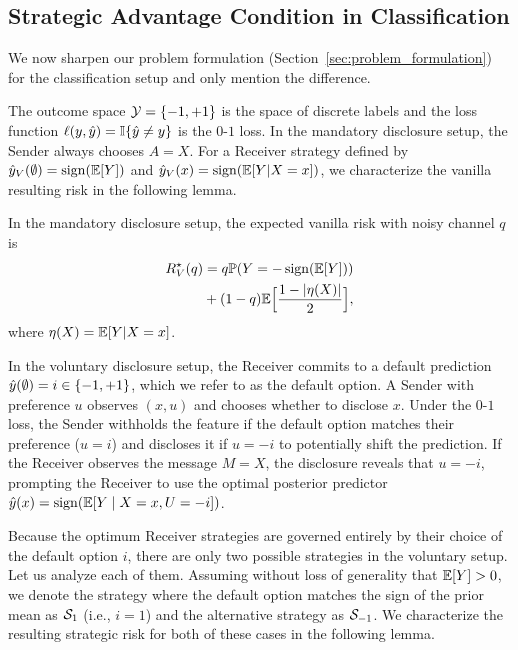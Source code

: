 \subsection{Strategic Advantage Condition in Classification}

We now sharpen our problem formulation (Section~\ref{sec:problem_formulation}) for the classification setup and only mention the difference.

The outcome space $\mathcal{Y} = \{-1,+1\}$ is the space of discrete labels and the loss function $\ell(y, \hat{y}) = \mathbb{I}\{\hat{y} \neq y\}$ is the $0$-$1$ loss. In the mandatory disclosure setup, the Sender always chooses $A=X$. For a Receiver strategy defined by $\hat{y}_V(\emptyset) = \operatorname{sign}(\mathbb{E}[Y])$ and $\hat{y}_V(x) = \operatorname{sign}(\mathbb{E}[Y|X=x])$, we characterize the vanilla resulting risk in the following lemma.

\begin{lemma} \label{lem:rv_classification}
In the mandatory disclosure setup, the expected vanilla risk with noisy channel $q$ is
\begin{align}
R_V^\star(q) &= q\mathbb{P}(Y=-\operatorname{sign}(\mathbb{E}[Y])) \nonumber \\
& + (1-q)\mathbb{E}\Big[\frac{1-|\eta(X)|}{2}\Big], \label{eq:rv_classification}
\end{align}
where $\eta(X) = \mathbb{E}[Y|X=x]$.
\end{lemma}

In the voluntary disclosure setup, the Receiver commits to a default prediction $\hat{y}(\emptyset) = i \in \{-1, +1\}$, which we refer to as the default option. A Sender with preference $u$ observes $(x, u)$ and chooses whether to disclose $x$. Under the $0$-$1$ loss, the Sender withholds the feature if the default option matches their preference ($u = i$) and discloses it if $u = -i$ to potentially shift the prediction. If the Receiver observes the message $M=X$, the disclosure reveals that $u = -i$, prompting the Receiver to use the optimal posterior predictor $\hat{y}(x) = \operatorname{sign}(\mathbb{E}[Y \mid X=x, U=-i])$.

Because the optimum Receiver strategies are governed entirely by their choice of the default option $i$, there are only two possible strategies in the voluntary setup. Let us analyze each of them. Assuming without loss of generality that $\mathbb{E}[Y] > 0$, we denote the strategy where the default option matches the sign of the prior mean as $\mathcal{S}_1$ (i.e., $i = 1$) and the alternative strategy as $\mathcal{S}_{-1}$. We characterize the resulting strategic risk for both of these cases in the following lemma.

